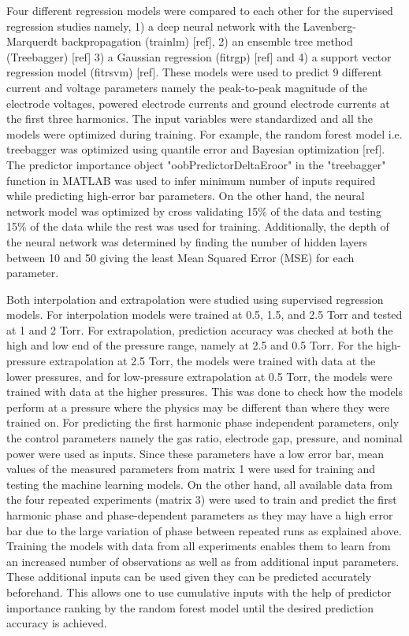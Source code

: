 \documentclass[12pt]{iopart}
\begin{document}
Four different regression models were compared to each other for the supervised regression studies namely, 1) a deep neural network with the Lavenberg- Marquerdt backpropagation (trainlm) [ref], 2) an ensemble tree method (Treebagger) [ref] 3) a Gaussian regression (fitrgp) [ref] and 4) a support vector regression model (fitrsvm) [ref]. These models were used to predict 9 different current and voltage parameters namely the peak-to-peak magnitude of the electrode voltages, powered electrode currents and ground electrode currents at the first three harmonics. The input variables were standardized and all the models were optimized during training. For example, the random forest model i.e. treebagger was optimized using quantile error and Bayesian optimization [ref]. The predictor importance object "oobPredictorDeltaEroor" in the "treebagger" function in MATLAB was used to infer minimum number of inputs required while predicting high-error bar parameters. On the other hand, the neural network model was optimized by cross validating 15\% of the data and testing 15\% of the data while the rest was used for training. Additionally, the depth of the neural network was determined by finding the number of hidden layers between 10 and 50 giving the least Mean Squared Error (MSE) for each parameter.

Both interpolation and extrapolation were studied using supervised regression models. For interpolation models were trained at 0.5, 1.5, and 2.5 Torr and tested at 1 and 2 Torr. For extrapolation, prediction accuracy was checked at both the high and low end of the pressure range, namely at 2.5 and 0.5 Torr. For the high-pressure extrapolation at 2.5 Torr, the models were trained with data at the lower pressures, and for low-pressure extrapolation at 0.5 Torr, the models were trained with data at the higher pressures. This was done to check how the models perform at a pressure where the physics may be different than where they were trained on. For predicting the first harmonic phase independent parameters, only the control parameters namely the gas ratio, electrode gap, pressure, and nominal power were used as inputs. Since these parameters have a low error bar, mean values of the measured parameters from matrix 1 were used for training and testing the machine learning models. On the other hand, all available data from the four repeated experiments (matrix 3) were used to train and predict the first harmonic phase and phase-dependent parameters as they may have a high error bar due to the large variation of phase between repeated runs as explained above. Training the models with data from all experiments enables them to learn from an increased number of observations as well as from additional input parameters. These additional inputs can be used given they can be predicted accurately beforehand. This allows one to use cumulative inputs with the help of predictor importance ranking by the random forest model until the desired prediction accuracy is achieved.
\end{document}
